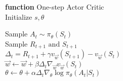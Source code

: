 \documentclass{standalone}
\begin{document}
\pagestyle{empty}
\begin{algorithm}[H]
  \textbf{function} One-step Actor Critic \\
  	Initialize $s, \theta$ \\

  	 {
  	Sample $A_t \sim \pi_\theta(S_t)$ \\
  	Sample $R_{t+1} \text{ and } S_{t+1}$ \\
  	$\Delta_t = R_{t+1} + \gamma v_{\vec{w}}(S_{t+1}) -v_{\vec{w}}(S_{t})$\\
  	$\vec{w} \leftarrow \vec{w} + \beta \Delta_t \nabla_{\vec{w}} v_{\vec{w}}(S_t)$\\
	$\theta \leftarrow \theta + \alpha \Delta_t \nabla_{\theta} \log \pi_{\theta}(A_t|S_t)$
  
}

\end{algorithm}
\end{document}
